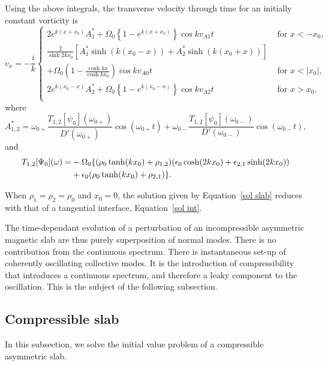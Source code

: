 Using the above integrals, the transverse velocity through time for an initially constant vorticity is
\begin{equation}
v_x = -\frac{i}{k}\begin{cases}
2 e^{k(x+x_0)} A^*_1 + \Omega_0 \left\{1 - e^{k(x+x_0)}\right\} \cos{kv_{A1}t} \quad &\text{ for } x<-x_0, \\
\frac{2}{\sinh{2kx_0}} \left[ A^*_1 \sinh(k(x_0 - x)) + A^*_2 \sinh(k(x_0 + x)) \right] & \\
+ \Omega_0 \left( 1 - \frac{\cosh{kx}}{\cosh{kx_0}} \right)\cos{kv_{A0}t} \quad &\text{ for } x < |x_0|, \\
2 e^{k(x_0-x)} A^*_2 + \Omega_0 \left\{1 - e^{k(x_0-x)}\right\} \cos{kv_{A2}t} \quad &\text{ for } x>x_0, \\
\end{cases}
\label{sol slab}
\end{equation}
where
\begin{equation}
A^*_{1,2} = \omega_{0+} \frac{T_{1,2}[\psi_0](\omega_{0+})}{D'(\omega_{0+})} \cos(\omega_{0+} t) + \omega_{0-}\frac{T_{1,2}[\psi_0](\omega_{0-})}{D'(\omega_{0-})} \cos(\omega_{0-} t),
\end{equation}
and
\begin{align}
T_{1,2}[\Psi_0](\omega) = &-\Omega_0\{ (\rho_0 \tanh(kx_0) + \rho_{1,2}) (\epsilon_0 \cosh(2kx_0) + \epsilon_{2,1}\sinh(2kx_0)) \notag \\
&+ \epsilon_0(\rho_0 \tanh(kx_0) + \rho_{2,1}) \}.
\end{align}

When $\rho_1 = \rho_2 = \rho_0$ and $x_0 = 0$, the solution given by Equation~\eqref{sol slab} reduces with that of a tangential interface, Equation~\eqref{sol int}.

The time-dependant evolution of a perturbation of an incompressible asymmetric magnetic slab are thus purely superposition of normal modes. There is no contribution from the continuous spectrum. There is instantaneous set-up of coherently oscillating collective modes. It is the introduction of compressibility that introduces a continuous spectrum, and therefore a leaky component to the oscillation. This is the subject of the following subsection.


\subsection{Compressible slab} \label{sec: compressible slab}

In this subsection, we solve the initial value problem of a compressible asymmetric slab. 

